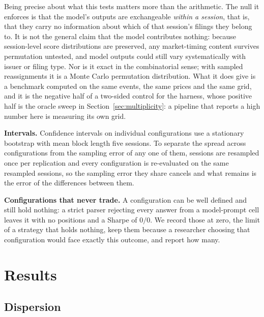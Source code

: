 \documentclass[sigconf]{acmart}
\begin{document}
Being precise about what this tests matters more than the arithmetic. The null it enforces is that
the model's outputs are exchangeable \emph{within a session}, that is, that they carry no
information about which of that session's filings they belong to. It is not the general claim that
the model contributes nothing: because session-level score distributions are preserved, any
market-timing content survives permutation untested, and model outputs could still vary
systematically with issuer or filing type. Nor is it exact in the combinatorial sense; with
\PermReps{} sampled reassignments it is a Monte Carlo permutation distribution. What it does give is
a benchmark computed on the same events, the same prices and the same grid, and it is the negative
half of a two-sided control for the harness, whose positive half is the oracle sweep in
Section~\ref{sec:multiplicity}: a pipeline that reports a high number here is measuring its own
grid.

\textbf{Intervals.} Confidence intervals on individual configurations use a stationary bootstrap
\cite{politis1994stationary} with mean block length five sessions. To separate the spread across
configurations from the sampling error of any one of them, sessions are resampled once per
replication and every configuration is re-evaluated on the same resampled sessions, so the sampling
error they share cancels and what remains is the error of the differences between them.

\textbf{Configurations that never trade.} A configuration can be well defined and still hold nothing:
a strict parser rejecting every answer from a model-prompt cell leaves it with no positions and a
Sharpe of $0/0$. We record those at zero, the limit of a strategy that holds nothing, keep them
because a researcher choosing that configuration would face exactly this outcome, and report how
many.

\section{Results}
\label{sec:results}

\subsection{Dispersion}
\label{sec:dispersion}
\end{document}
